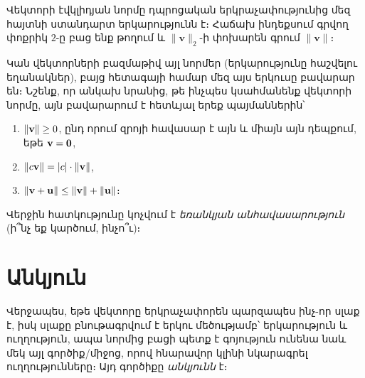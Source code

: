 Վեկտորի էվկլիդյան նորմը դպրոցական երկրաչափությունից մեզ հայտնի ստանդարտ երկարությունն է։ Հաճախ ինդեքսում գրվող փոքրիկ $2$-ը բաց ենք թողում և $\|\mathbf{v}\|_2$-ի փոխարեն գրում $\|\mathbf{v}\|$։


Կան վեկտորների բազմաթիվ այլ նորմեր (երկարությունը հաշվելու եղանակներ), բայց հետագայի համար մեզ այս երկուսը բավարար են։ Նշենք, որ անկախ նրանից, թե ինչպես կսահմանենք վեկտորի նորմը, այն բավարարում է հետևյալ երեք պայմաններին՝ 
\begin{enumerate}
    \item $\|\mathbf{v}\|\ge 0$, ընդ որում զրոյի հավասար է այն և միայն այն դեպքում, եթե $\mathbf{v}=\mathbf{0}$,
    \item $\|c\mathbf{v}\| = |c|\cdot \|\mathbf{v}\|$,
    \item $\|\mathbf{v}+\mathbf{u}\| \le \|\mathbf{v}\|+\|\mathbf{u}\|$։

    \begin{figure}[h]
    \centering
{}
\end{figure}
\end{enumerate}

Վերջին հատկությունը կոչվում է \textit{եռանկյան անհավասարություն} (ի՞նչ եք կարծում, ինչո՞ւ)։ 


\section{Անկյուն}

Վերջապես, եթե վեկտորը երկրաչափորեն պարզապես ինչ-որ սլաք է, իսկ սլաքը բնութագրվում է երկու մեծությամբ՝ երկարություն և ուղղություն, ապա նորմից բացի պետք է գոյություն ունենա նաև մեկ այլ գործիք/միջոց, որով հնարավոր կլինի նկարագրել ուղղությունները։ Այդ գործիքը \textit{անկյունն} է։



\begin{center}
\end{center}

